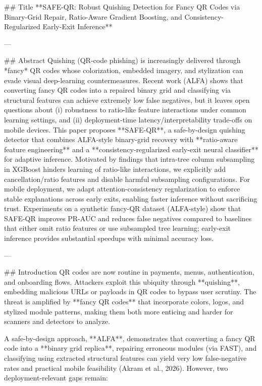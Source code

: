 ## Title  
**SAFE-QR: Robust Quishing Detection for Fancy QR Codes via Binary-Grid Repair, Ratio-Aware Gradient Boosting, and Consistency-Regularized Early-Exit Inference**

---

## Abstract  
Quishing (QR-code phishing) is increasingly delivered through *fancy* QR codes whose colorization, embedded imagery, and stylization can evade visual deep-learning countermeasures. Recent work (ALFA) shows that converting fancy QR codes into a repaired binary grid and classifying via structural features can achieve extremely low false negatives, but it leaves open questions about (i) robustness to ratio-like feature interactions under common learning settings, and (ii) deployment-time latency/interpretability trade-offs on mobile devices. This paper proposes **SAFE-QR**, a safe-by-design quishing detector that combines ALFA-style binary-grid recovery with **ratio-aware feature engineering** and a **consistency-regularized early-exit neural classifier** for adaptive inference. Motivated by findings that intra-tree column subsampling in XGBoost hinders learning of ratio-like interactions, we explicitly add cancellation/ratio features and disable harmful subsampling configurations. For mobile deployment, we adapt attention-consistency regularization to enforce stable explanations across early exits, enabling faster inference without sacrificing trust. Experiments on a synthetic fancy-QR dataset (ALFA-style) show that SAFE-QR improves PR-AUC and reduces false negatives compared to baselines that either omit ratio features or use subsampled tree learning; early-exit inference provides substantial speedups with minimal accuracy loss.  

---

## Introduction  
QR codes are now routine in payments, menus, authentication, and onboarding flows. Attackers exploit this ubiquity through **quishing**, embedding malicious URLs or payloads in QR codes to bypass user scrutiny. The threat is amplified by **fancy QR codes** that incorporate colors, logos, and stylized module patterns, making them both more enticing and harder for scanners and detectors to analyze.

A safe-by-design approach, **ALFA**, demonstrates that converting a fancy QR code into a **binary grid replica**, repairing erroneous modules (via FAST), and classifying using extracted structural features can yield very low false-negative rates and practical mobile feasibility (Akram et al., 2026). However, two deployment-relevant gaps remain:


